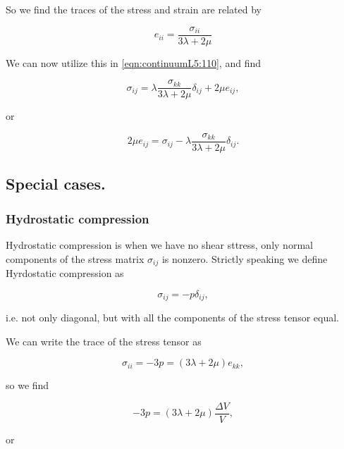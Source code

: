 So we find the traces of the stress and strain are related by

\begin{equation}\label{eqn:continuumL5:130}
e_{ii} = \frac{\sigma_{ii}}{3 \lambda + 2 \mu}
\end{equation}

We can now utilize this in \ref{eqn:continuumL5:110}, and find

\begin{equation}\label{eqn:continuumL5:110b}
\sigma_{ij} = \lambda \frac{\sigma_{kk}}{3 \lambda + 2 \mu} \delta_{ij} + 2 \mu e_{ij},
\end{equation}

or

\begin{equation}\label{eqn:continuumL5:110b}
2 \mu e_{ij} =
\sigma_{ij} - \lambda \frac{\sigma_{kk}}{3 \lambda + 2 \mu} \delta_{ij}.
\end{equation}

\subsection{Special cases.}
\subsubsection{Hydrostatic compression}

Hydrostatic compression is when we have no shear sttress, only normal components of the stress matrix $\sigma_{ij}$ is nonzero.  Strictly speaking we define Hyrdostatic compression as 

\begin{equation}\label{eqn:continuumL5:n}
\sigma_{ij} = -p \delta_{ij},
\end{equation}

i.e. not only diagonal, but with all the components of the stress tensor equal.

We can write the trace of the stress tensor as

\begin{equation}\label{eqn:continuumL5:n}
\sigma_{ii} = - 3 p = (3 \lambda + 2 \mu) e_{kk},
\end{equation}

so we find

\begin{equation}\label{eqn:continuumL5:n}
- 3 p = (3 \lambda + 2 \mu) \frac{\Delta V}{V},
\end{equation}

or

